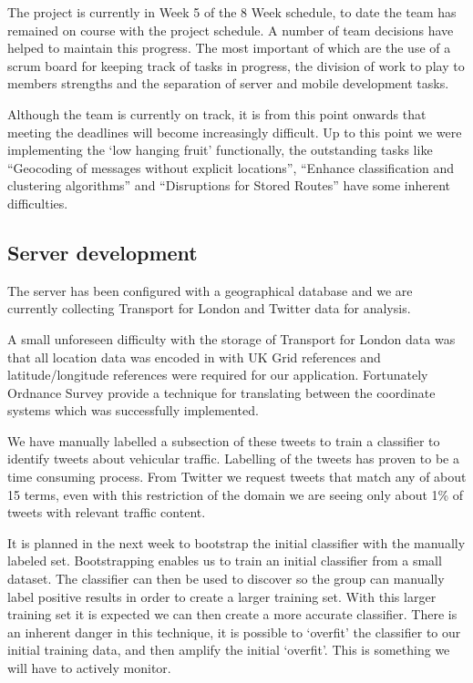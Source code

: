 The project is currently in Week 5 of the 8 Week schedule, to date the team has
remained on course with the project schedule. A number of team decisions have
helped to maintain this progress. The most important of which are the use of a
scrum board for keeping track of tasks in progress, the division of work to
play to members strengths and the separation of server and mobile development
tasks.

Although the team is currently on track, it is from this point onwards that
meeting the deadlines will become increasingly difficult. Up to this point we
were implementing the ‘low hanging fruit’ functionally, the outstanding tasks
like “Geocoding of messages without explicit locations”, “Enhance
classification and clustering algorithms” and “Disruptions for Stored Routes”
have some inherent difficulties.

\subsection{Server development}

The server has been configured with a geographical database and we are
currently collecting Transport for London and Twitter data for analysis.

A small unforeseen difficulty with the storage of Transport for London data was
that all location data was encoded in with UK Grid references and
latitude/longitude references were required for our application. Fortunately
Ordnance Survey provide a technique for translating between the coordinate
systems which was successfully implemented.

We have manually labelled a subsection of these tweets to train a
classifier to identify tweets about vehicular traffic. Labelling of the tweets
has proven to be a time consuming process. From Twitter we request tweets that
match any of about 15 terms, even with this restriction of the domain
we are seeing only about 1\% of tweets with relevant traffic content.

It is planned in the next week to bootstrap the initial classifier with the manually
labeled set. Bootstrapping enables us to train an initial classifier from a
small dataset. The classifier can then be used to discover so the group can manually label
positive results in order to create a larger training set. With this larger
training set it is expected we can then create a more accurate classifier.
There is an inherent danger in this technique, it is possible to `overfit' the
classifier to our initial training data, and then amplify the initial `overfit'. This
is something we will have to actively monitor.


